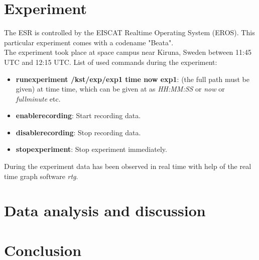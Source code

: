 \documentclass{article}
\begin{document}

\section{Experiment}

The ESR is controlled by the EISCAT Realtime Operating System (EROS). This particular experiment comes with a codename "Beata".\\
The experiment took place at space campus near Kiruna, Sweden between 11:45 UTC and 12:15 UTC.
List of used commands during the experiment:
\begin{itemize}
\item \textbf{runexperiment /kst/exp/exp1 time now exp1}: (the full path must be given) at time time, which can be given at as \emph{HH:MM:SS} or \emph{now} or \emph{fullminute} etc.
\item \textbf{enablerecording}: Start recording data.
\item \textbf{disablerecording}: Stop recording data.
\item \textbf{stopexperiment}: Stop experiment immediately.
\end{itemize}
During the experiment data has been observed in real time with help of the real time graph software \emph{rtg}.


\section{Data analysis and discussion}


\section{Conclusion}
\end{document}
